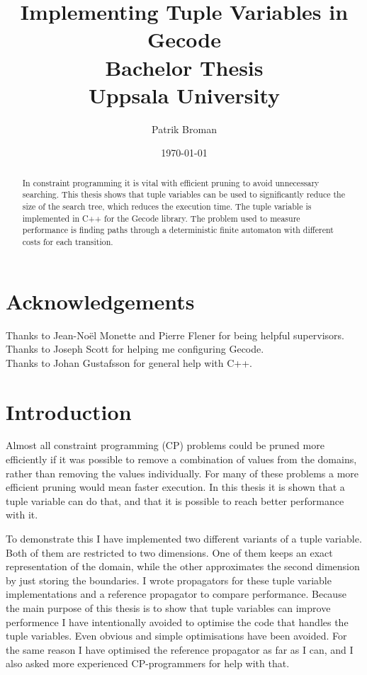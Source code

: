 \documentclass[a4paper,11pt]{article}
\title{\textbf{Implementing Tuple Variables in Gecode \\
	Bachelor Thesis \\
    Uppsala University  \\
  }
}
\author{Patrik Broman}
\date{\today}
\begin{document}
\maketitle

\begin{abstract}
In constraint programming it is vital with efficient pruning to avoid unnecessary searching. This thesis shows that tuple variables can be used to significantly reduce the size of the search tree, which reduces the execution time. The tuple variable is implemented in C++ for the Gecode library. The problem used to measure performance is finding paths through a deterministic finite automaton with different costs for each transition.
\end{abstract}

\setcounter{tocdepth}{2}
\tableofcontents

\section*{Acknowledgements}
Thanks to Jean-No\"{e}l Monette and Pierre Flener for being helpful supervisors. \\
Thanks to Joseph Scott for helping me configuring Gecode. \\
Thanks to Johan Gustafsson for general help with C++. \\

\section{Introduction}
Almost all constraint programming (CP) problems could be pruned more efficiently if it was possible to remove a combination of values from the domains, rather than removing the values individually. For many of these problems a more efficient pruning would mean faster execution. In this thesis it is shown that a tuple variable can do that, and that it is possible to reach better performance with it.

To demonstrate this I have implemented two different variants of a tuple variable. Both of them are restricted to two dimensions. One of them keeps an exact representation of the domain, while the other approximates the second dimension by just storing the boundaries. I wrote propagators for these tuple variable implementations and a reference propagator to compare performance. Because the main purpose of this thesis is to show that tuple variables can improve performence I have intentionally avoided to optimise the code that handles the tuple variables. Even obvious and simple optimisations have been avoided. For the same reason I have optimised the reference propagator as far as I can, and I also asked more experienced CP-programmers for help with that.
\end{document}
